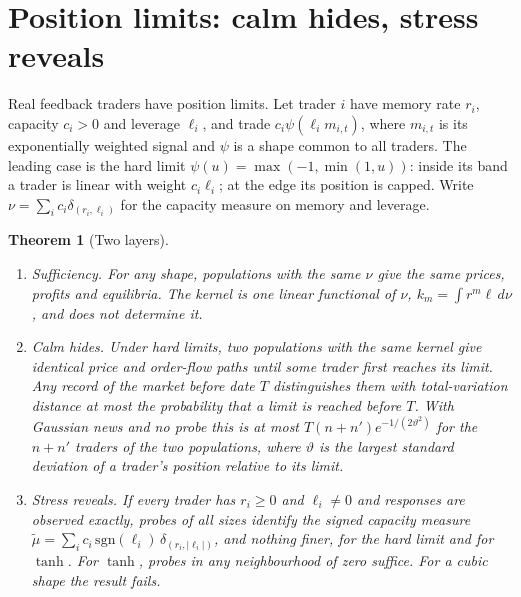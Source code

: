 \documentclass[12pt]{article}
\newtheorem{theorem}{Theorem}[section]
\theoremstyle{definition}
\theoremstyle{remark}
\begin{document}
\section{Position limits: calm hides, stress reveals}\label{n:sat}

Real feedback traders have position limits. Let trader $i$ have memory rate $r_i$, capacity $c_i>0$ and leverage $\ell_i$, and trade $c_i\psi(\ell_im_{i,t})$, where $m_{i,t}$ is its exponentially weighted signal and $\psi$ is a shape common to all traders. The leading case is the hard limit $\psi(u)=\max(-1,\min(1,u))$: inside its band a trader is linear with weight $c_i\ell_i$; at the edge its position is capped. Write $\nu=\sum_ic_i\delta_{(r_i,\ell_i)}$ for the capacity measure on memory and leverage.

\begin{theorem}[Two layers]\label{n:sat_thm}
\begin{enumerate}[label=(\roman*),itemsep=1pt]
\item \emph{Sufficiency.} For any shape, populations with the same $\nu$ give the same prices, profits and equilibria. The kernel is one linear functional of $\nu$, $k_m=\int r^m\ell\,d\nu$, and does not determine it.
\item \emph{Calm hides.} Under hard limits, two populations with the same kernel give identical price and order-flow paths until some trader first reaches its limit. Any record of the market before date $T$ distinguishes them with total-variation distance at most the probability that a limit is reached before $T$. With Gaussian news and no probe this is at most $T(n+n')e^{-1/(2\vartheta^2)}$ for the $n+n'$ traders of the two populations, where $\vartheta$ is the largest standard deviation of a trader's position relative to its limit.
\item \emph{Stress reveals.} If every trader has $r_i\ge0$ and $\ell_i\ne0$ and responses are observed exactly, probes of all sizes identify the signed capacity measure $\tilde\mu=\sum_ic_i\,\mathrm{sgn}(\ell_i)\,\delta_{(r_i,|\ell_i|)}$, and nothing finer, for the hard limit and for $\tanh$. For $\tanh$, probes in any neighbourhood of zero suffice. For a cubic shape the result fails.
\end{enumerate}
\end{theorem}
\end{document}
